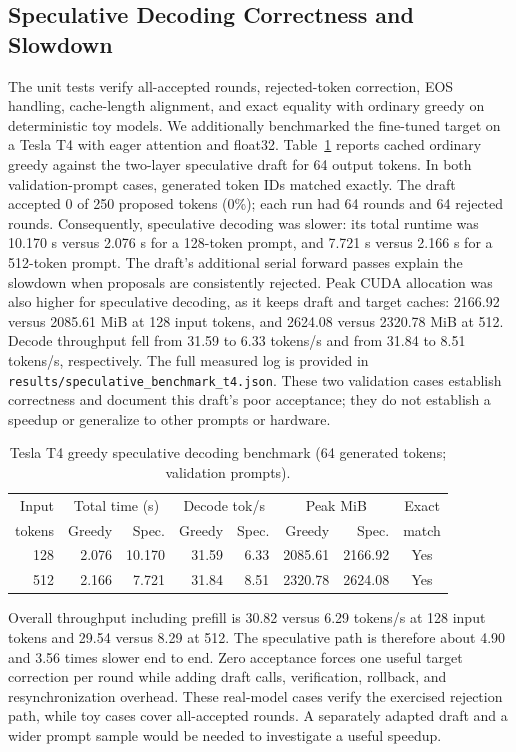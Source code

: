 \documentclass[conference]{IEEEtran}
\begin{document}
\subsection{Speculative Decoding Correctness and Slowdown}
The unit tests verify all-accepted rounds, rejected-token correction, EOS handling, cache-length alignment, and exact equality with ordinary greedy on deterministic toy models. We additionally benchmarked the fine-tuned target on a Tesla T4 with eager attention and float32. Table~\ref{tab:specbench} reports cached ordinary greedy against the two-layer speculative draft for 64 output tokens. In both validation-prompt cases, generated token IDs matched exactly. The draft accepted 0 of 250 proposed tokens (0\%); each run had 64 rounds and 64 rejected rounds. Consequently, speculative decoding was slower: its total runtime was 10.170 s versus 2.076 s for a 128-token prompt, and 7.721 s versus 2.166 s for a 512-token prompt. The draft's additional serial forward passes explain the slowdown when proposals are consistently rejected. Peak CUDA allocation was also higher for speculative decoding, as it keeps draft and target caches: 2166.92 versus 2085.61 MiB at 128 input tokens, and 2624.08 versus 2320.78 MiB at 512. Decode throughput fell from 31.59 to 6.33 tokens/s and from 31.84 to 8.51 tokens/s, respectively. The full measured log is provided in \texttt{results/speculative\_benchmark\_t4.json}. These two validation cases establish correctness and document this draft's poor acceptance; they do not establish a speedup or generalize to other prompts or hardware.

\begin{table}[t]
\centering
\caption{Tesla T4 greedy speculative decoding benchmark (64 generated tokens; validation prompts).}
\label{tab:specbench}
\begin{tabular}{r|rr|rr|rr|c}
\toprule
Input & \multicolumn{2}{c|}{Total time (s)} & \multicolumn{2}{c|}{Decode tok/s} & \multicolumn{2}{c|}{Peak MiB} & Exact\\
tokens & Greedy & Spec. & Greedy & Spec. & Greedy & Spec. & match\\
\midrule
128 & 2.076 & 10.170 & 31.59 & 6.33 & 2085.61 & 2166.92 & Yes\\
512 & 2.166 & 7.721 & 31.84 & 8.51 & 2320.78 & 2624.08 & Yes\\
\bottomrule
\end{tabular}
\end{table}

Overall throughput including prefill is 30.82 versus 6.29 tokens/s at 128 input tokens and 29.54 versus 8.29 at 512. The speculative path is therefore about 4.90 and 3.56 times slower end to end. Zero acceptance forces one useful target correction per round while adding draft calls, verification, rollback, and resynchronization overhead. These real-model cases verify the exercised rejection path, while toy cases cover all-accepted rounds. A separately adapted draft and a wider prompt sample would be needed to investigate a useful speedup.
\end{document}
